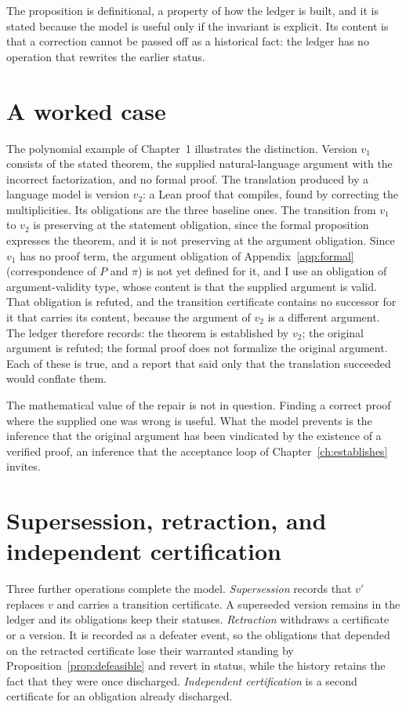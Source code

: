 The proposition is definitional, a property of how the ledger is built, and it is stated because the model is useful only if the invariant is explicit. Its content is that a correction cannot be passed off as a historical fact: the ledger has no operation that rewrites the earlier status.

\section{A worked case}

The polynomial example of Chapter~1 illustrates the distinction. Version $v_1$ consists of the stated theorem, the supplied natural-language argument with the incorrect factorization, and no formal proof. The translation produced by a language model is version $v_2$: a Lean proof that compiles, found by correcting the multiplicities. Its obligations are the three baseline ones. The transition from $v_1$ to $v_2$ is preserving at the statement obligation, since the formal proposition expresses the theorem, and it is not preserving at the argument obligation. Since $v_1$ has no proof term, the argument obligation of Appendix~\ref{app:formal} (correspondence of $P$ and $\pi$) is not yet defined for it, and I use an obligation of argument-validity type, whose content is that the supplied argument is valid. That obligation is refuted, and the transition certificate contains no successor for it that carries its content, because the argument of $v_2$ is a different argument. The ledger therefore records: the theorem is established by $v_2$; the original argument is refuted; the formal proof does not formalize the original argument. Each of these is true, and a report that said only that the translation succeeded would conflate them.

The mathematical value of the repair is not in question. Finding a correct proof where the supplied one was wrong is useful. What the model prevents is the inference that the original argument has been vindicated by the existence of a verified proof, an inference that the acceptance loop of Chapter~\ref{ch:establishes} invites.

\section{Supersession, retraction, and independent certification}

Three further operations complete the model. \emph{Supersession} records that $v'$ replaces $v$ and carries a transition certificate. A superseded version remains in the ledger and its obligations keep their statuses. \emph{Retraction} withdraws a certificate or a version. It is recorded as a defeater event, so the obligations that depended on the retracted certificate lose their warranted standing by Proposition~\ref{prop:defeasible} and revert in status, while the history retains the fact that they were once discharged. \emph{Independent certification} is a second certificate for an obligation already discharged.

